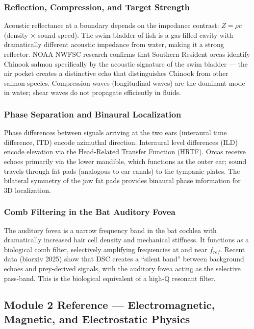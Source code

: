 \documentclass[11pt,letterpaper]{article}
\begin{document}
\subsubsection{Reflection, Compression, and Target Strength}
Acoustic reflectance at a boundary depends on the impedance contrast: $Z = \rho c$ (density $\times$ sound speed). The swim bladder of fish is a gas-filled cavity with dramatically different acoustic impedance from water, making it a strong reflector. NOAA NWFSC research confirms that Southern Resident orcas identify Chinook salmon specifically by the acoustic signature of the swim bladder --- the air pocket creates a distinctive echo that distinguishes Chinook from other salmon species. Compression waves (longitudinal waves) are the dominant mode in water; shear waves do not propagate efficiently in fluids.

\subsubsection{Phase Separation and Binaural Localization}
Phase differences between signals arriving at the two ears (interaural time difference, ITD) encode azimuthal direction. Interaural level differences (ILD) encode elevation via the Head-Related Transfer Function (HRTF). Orcas receive echoes primarily via the lower mandible, which functions as the outer ear; sound travels through fat pads (analogous to ear canals) to the tympanic plates. The bilateral symmetry of the jaw fat pads provides binaural phase information for 3D localization.

\subsubsection{Comb Filtering in the Bat Auditory Fovea}
The auditory fovea is a narrow frequency band in the bat cochlea with dramatically increased hair cell density and mechanical stiffness. It functions as a biological comb filter, selectively amplifying frequencies at and near $f_{ref}$. Recent data (biorxiv 2025) show that DSC creates a ``silent band'' between background echoes and prey-derived signals, with the auditory fovea acting as the selective pass-band. This is the biological equivalent of a high-Q resonant filter.

\subsection{Module 2 Reference --- Electromagnetic, Magnetic, and Electrostatic Physics}
\end{document}
